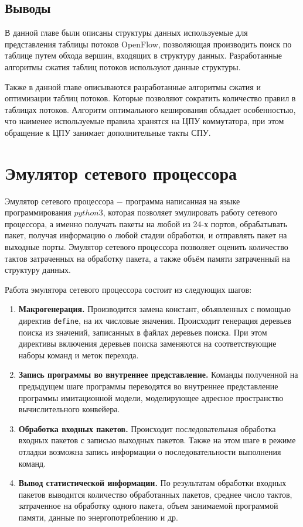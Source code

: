 \documentclass[oneside,final,12pt]{extarticle}
\begin{document}
\subsection{Выводы}
        В данной главе были описаны структуры данных используемые для представления таблицы потоков OpenFlow, 
        позволяющая производить поиск по таблице путем обхода вершин, входящих в структуру данных. 
        Разработанные алгоритмы сжатия таблиц потоков используют данные структуры. 

        Также в данной главе описываются разработанные алгоритмы сжатия и оптимизации таблиц потоков.
        Которые позволяют сократить количество правил в таблицах потоков. 
        Алгоритм оптимального кеширования обладает особенностью, что наименее используемые правила
        хранятся на ЦПУ коммутатора, при этом обращение к ЦПУ занимает дополнительные такты СПУ.

\section{Эмулятор сетевого процессора}
        \label{sect:emul}
        Эмулятор сетевого процессора $-$ программа написанная на языке программирования $python3$, которая позволяет эмулировать работу сетевого процессора, 
        а именно получать пакеты на любой из 24-х портов, обрабатывать пакет, получая информацию о любой стадии обработки, и отправлять пакет на выходные порты.
        Эмулятор сетевого процессора позволяет оценить количество тактов затраченных на обработку пакета, а также объём памяти затраченный на структуру данных.

        Работа эмулятора сетевого процессора состоит из следующих шагов:
        \begin{enumerate}
            \item \textbf{Макрогенерация.} Производится замена констант, объявленных с помощью 
                директив \texttt{define}, на их числовые значения. Происходит генерация 
                деревьев поиска из значений, записанных в файлах деревьев поиска. 
                При этом директивы включения деревьев поиска заменяются на соответствующие наборы 
                команд и меток перехода.
            \item \textbf{Запись программы во внутреннее представление.} Команды полученной на 
                предыдущем шаге программы переводятся во внутреннее представление программы 
                имитационной модели, моделирующее адресное пространство вычислительного конвейера.
            \item \textbf{Обработка входных пакетов.} Происходит последовательная обработка 
                входных пакетов с записью выходных пакетов. Также на этом шаге в режиме отладки 
                возможна запись информации о последовательности выполнения команд.
            \item \textbf{Вывод статистической информации.} По результатам обработки входных 
                пакетов выводится количество обработанных пакетов, среднее число тактов, 
                затраченное на обработку одного пакета, объем занимаемой программой памяти, 
                данные по энергопотреблению и др.
        \end{enumerate}
\end{document}
